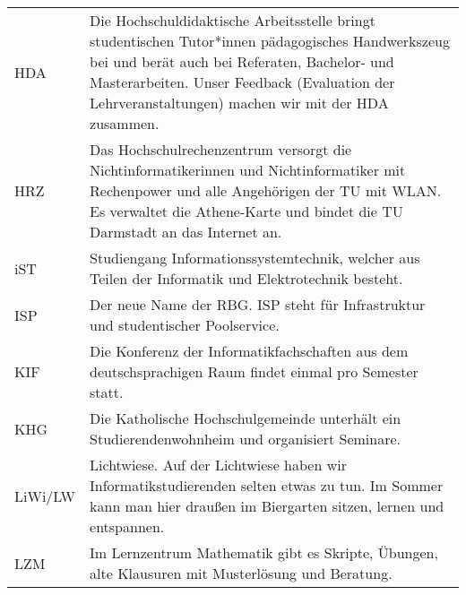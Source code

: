 \begin{longtable}{p{20mm}p{85mm}}
    HDA          & Die Hochschuldidaktische Arbeitsstelle bringt studentischen Tutor*innen pädagogisches Handwerkszeug bei und berät auch bei Referaten, Bachelor- und Masterarbeiten. Unser Feedback (Evaluation der Lehrveranstaltungen) machen wir mit der HDA zusammen.                \\
    HRZ          & Das Hochschulrechenzentrum versorgt die Nichtinformatikerinnen und Nichtinformatiker mit Rechenpower und alle Angehörigen der TU mit WLAN. Es verwaltet die Athene-Karte und bindet die TU Darmstadt an das Internet an.                                                \\
    iST          & Studiengang Informationssystemtechnik, welcher aus Teilen der Informatik und Elektrotechnik besteht.                                                                                                                                                                    \\
    ISP          & Der neue Name der RBG. ISP steht für Infrastruktur und studentischer Poolservice.                                                                                                                                                                                       \\
    KIF          & Die Konferenz der Informatikfachschaften aus dem deutschsprachigen Raum findet einmal pro Semester statt.                                                                                                                                                               \\
    KHG          & Die Katholische Hochschulgemeinde unterhält ein Studierendenwohnheim und organisiert Seminare.                                                                                                                                                                          \\
    LiWi/LW      & Lichtwiese. Auf der Lichtwiese haben wir Informatikstudierenden selten etwas zu tun. Im Sommer kann man hier draußen im Biergarten sitzen, lernen und entspannen.                                                                                                       \\
    LZM          & Im Lernzentrum Mathematik gibt es Skripte, Übungen, alte Klausuren mit Musterlösung und Beratung.                                                                                                                                                                       \\

\end{longtable}
